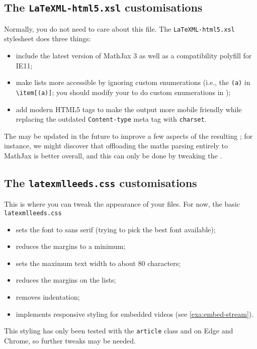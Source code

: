 \documentclass[a4paper]{article}
\def\ltxinline{\lstinline[style=latexml,frame=none]}
\theoremstyle{definition}
\begin{document}
\subsection{The \texttt{LaTeXML-html5.xsl} customisations}
\label{sub:xslt}
Normally, you do not need to care about this file. The \verb|LaTeXML-html5.xsl| \XSLT{} stylesheet does three things:
\begin{itemize}
  \item include the latest version of MathJax 3 as well as a compatibility polyfill for IE11;
  \item make \HTML{} lists more accessible by ignoring custom enumerations (i.e., the \ltxinline|(a)| in \ltxinline|\item[(a)]|; you should modify your \CSS{} to do custom enumerations in \HTML{});
  \item add modern HTML5 tags to make the output more mobile friendly while replacing the outdated \verb|Content-type| meta tag with \verb|charset|.
\end{itemize}
The \XSLT{} may be updated in the future to improve a few aspects of the resulting \HTML{}; for instance, we might discover that offloading the maths parsing entirely to MathJax is better overall, and this can only be done by tweaking the \XSLT{}.

\subsection{The \texttt{latexmlleeds.css} customisations}
\label{sub:css}
This is where you can tweak the appearance of your \HTML{} files. For now, the basic \verb|latexmlleeds.css|
\begin{itemize}
  \item sets the font to sans serif (trying to pick the best font available);
  \item reduces the margins to a minimum;
  \item sets the maximum text width to about 80 characters;
  \item reduces the margins on the lists;
  \item removes indentation;
  \item implements responsive styling for embedded videos (see \autoref{exa:embed-stream}).
\end{itemize}
This styling has only been tested with the \verb|article| class and on Edge and Chrome, so further tweaks may be needed.
\end{document}
